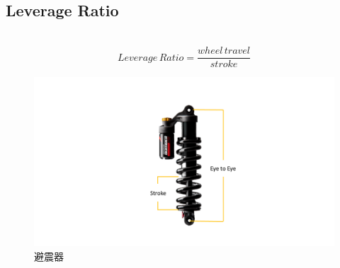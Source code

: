 \documentclass[14pt,a4paper]{report}  %
\newcommand{\fourteen}{\fontsize{14pt}{\baselineskip}\selectfont}%
\begin{document}
{       
       \hspace*{\fill} \\
       \subsection{Leverage Ratio}
       \fourteen {Leverage ratio是避震器壓縮量和後輪行程的比值，當較大的槓桿比率會對避震器產生較大的衝擊，而在騎乘時對於地形變化的感受度較不敏感，相反地較小的槓桿比率對於地形的敏感度較高。其計算方式如下所示。}
       \hspace*{\fill} \\
       \begin{equation}
       Leverage\, Ratio = \frac{wheel\,travel}{stroke}
       \end{equation}

       
       \begin{figure}[hbt!]
        \centering
        \includegraphics[scale=0.4]{stroke.png}
        \caption{避震器}
        \label{fig_stroke:scale}
    	\end{figure}
       
	   \newpage
}
\end{document}
